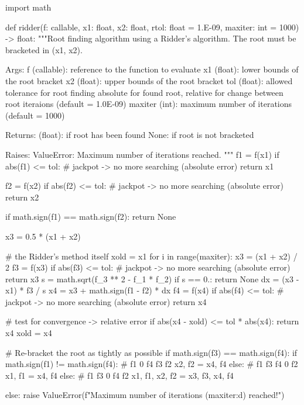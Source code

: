 \begin{python}
import math

def ridder(f: callable, x1: float, x2: float,
           rtol: float = 1.E-09, maxiter: int = 1000) -> float:
    """Root finding algorithm using a Ridder's algorithm. The root must be
    bracketed in (x1, x2).

    Args:
        f (callable):  reference to the function to evaluate
        x1 (float):    lower bounds of the root bracket
        x2 (float):    upper bounds of the root bracket
        tol (float):   allowed tolerance for root finding
                       absolute for found root, relative for
                       change between root iteraions
                       (default = 1.0E-09)
        maxiter (int): maximum number of iterations
                       (default = 1000)

    Returns:
        (float): if root has been found
        None:    if root is not bracketed

    Raises:
        ValueError: Maximum number of iterations reached.
    """
    f1 = f(x1)
    if abs(f1) <= tol: # jackpot -> no more searching (absolute error)
        return x1

    f2 = f(x2)
    if abs(f2) <= tol: # jackpot -> no more searching (absolute error)
        return x2

    if math.sign(f1) == math.sign(f2):
        return None

    x3 = 0.5 * (x1 + x2)

    # the Ridder's method itself
    xold = x1
    for i in range(maxiter):
        x3 = (x1 + x2) / 2
        f3 = f(x3)
        if abs(f3) <= tol: # jackpot -> no more searching (absolute error)
            return x3
        s = math.sqrt(f_3 ** 2 - f_1 * f_2)
        if s == 0.:
            return None
        dx = (x3 - x1) * f3 / s
        x4 = x3 + math.sign(f1 - f2) * dx
        f4 = f(x4)
        if abs(f4) <= tol: # jackpot -> no more searching (absolute error)
            return x4

        # test for convergence -> relative error
        if abs(x4 - xold) <= tol * abs(x4):
            return x4
        xold = x4

        # Re-bracket the root as tightly as possible
        if math.sign(f3) == math.sign(f4):
            if math.sign(f1) != math.sign(f4):
                # f1  0  f4  f3  f2
                x2, f2 = x4, f4
            else:
                # f1  f3  f4  0  f2
                x1, f1 = x4, f4
        else:
            # f1  f3  0  f4  f2
            x1, f1, x2, f2 = x3, f3, x4, f4

    else:
        raise ValueError(f"Maximum number of iterations ({maxiter:d}) reached!")

\end{python}


